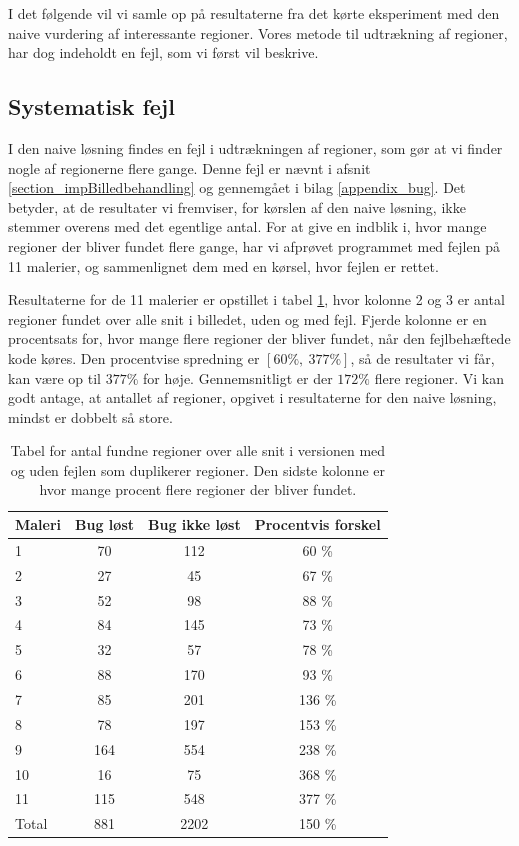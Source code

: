 {
{\sffamily I det følgende vil vi samle op på resultaterne fra det kørte
eksperiment med den naive vurdering af interessante regioner. Vores
metode til udtrækning af regioner, har dog indeholdt en fejl, som vi
først vil beskrive.
}

\subsection{Systematisk fejl\label{program_bug}}
I den naive løsning findes en fejl i udtrækningen af regioner, som gør
at vi finder nogle af regionerne flere gange. Denne fejl er nævnt i
afsnit \ref{section_impBilledbehandling} og gennemgået i bilag
\ref{appendix_bug}. Det betyder, at de resultater vi fremviser, for
kørslen af den naive løsning, ikke stemmer overens med det egentlige
antal. For at give en indblik i, hvor mange regioner der bliver fundet
flere gange, har vi afprøvet programmet med fejlen på 11 malerier, og
sammenlignet dem med en kørsel, hvor fejlen er rettet.

Resultaterne for de 11 malerier er opstillet i tabel \ref{bug_tabel},
hvor kolonne 2 og 3 er antal regioner fundet over alle snit i billedet,
uden og med fejl.  Fjerde kolonne er en procentsats for, hvor mange
flere regioner der bliver fundet, når den fejlbehæftede kode køres. Den
procentvise spredning er $[60 \%,~377 \%]$, så de resultater vi får, kan
være op til $377\%$ for høje.  Gennemsnitligt er der $172 \%$ flere
regioner. Vi kan godt antage, at antallet af regioner, opgivet i
resultaterne for den naive løsning, mindst er dobbelt så store.

\begin{table}[!h]
    \centering
    \begin{tabular}{|l|c|c|c|}
        \hline
  Maleri  & Bug løst 		& Bug ikke løst		& Procentvis forskel\\\hline
        1   & 70 			& 112 				& 60 \% \\
        2   & 27 			& 45 				& 67 \% \\
        3	& 52 			& 98 				& 88 \% \\
        4   & 84 			& 145 				& 73 \% \\
        5	& 32 			& 57 				& 78 \% \\
        6   & 88 			& 170 				& 93 \% \\
        7   & 85 			& 201 				& 136 \% \\
        8   & 78 			& 197 				& 153 \% \\
        9   & 164 			& 554 				& 238 \% \\
        10	& 16 			& 75 				& 368 \% \\
        11	& 115 			& 548 				& 377 \% \\\hline
	Total	& 881			& 2202				& 150 \% \\\hline
	  \end{tabular}
    \caption[]{Tabel for antal fundne regioner over alle snit i
    versionen med og uden fejlen som duplikerer regioner. Den sidste
    kolonne er hvor mange procent flere regioner der bliver fundet.}
    \label{bug_tabel}
\end{table}

}
